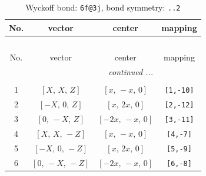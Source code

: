 \documentclass[fleqn,8pt]{jsarticle}
\begin{document}
\begin{longtable}{cccc}
\caption{Wyckoff bond: {\tt 6f@3j}, bond symmetry: {\tt ..2}}
 \\
 \hline \hline
No. & vector & center & mapping \\ \hline \endfirsthead

\multicolumn{3}{l}{\tablename\ \thetable{}} \\
 \hline \hline
No. & vector & center & mapping \\ \hline \endhead

 \hline \hline
\multicolumn{3}{r}{\footnotesize\it continued ...} \\ \endfoot

 \hline \hline
\multicolumn{3}{r}{} \\ \endlastfoot

1 & $\left[ X,\, X,\, Z \right]$ & $\left[ x,\, - x,\, 0 \right]$ & {\tt [1,-10]} \\ \hline
2 & $\left[ - X,\, 0,\, Z \right]$ & $\left[ x,\, 2 x,\, 0 \right]$ & {\tt [2,-12]} \\ \hline
3 & $\left[ 0,\, - X,\, Z \right]$ & $\left[ - 2 x,\, - x,\, 0 \right]$ & {\tt [3,-11]} \\ \hline
4 & $\left[ X,\, X,\, - Z \right]$ & $\left[ x,\, - x,\, 0 \right]$ & {\tt [4,-7]} \\ \hline
5 & $\left[ - X,\, 0,\, - Z \right]$ & $\left[ x,\, 2 x,\, 0 \right]$ & {\tt [5,-9]} \\ \hline
6 & $\left[ 0,\, - X,\, - Z \right]$ & $\left[ - 2 x,\, - x,\, 0 \right]$ & {\tt [6,-8]} \\
\end{longtable}
\renewcommand{\arraystretch}{1.2}
\end{document}
